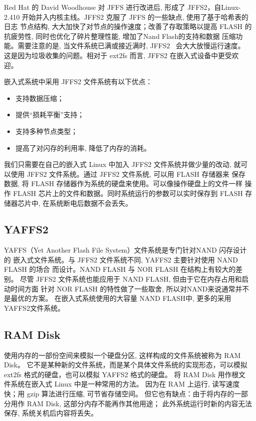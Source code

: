 Red Hat 的 David Woodhouse 对 JFFS 进行改进后, 形成了 JFFS2，自Linux-2.410
开始并入内核主线。JFFS2 克服了 JFFS 的一些缺点, 使用了基于哈希表的日志
节点结构, 大大加快了对节点的操作速度；改善了存取策略以提高 FLASH 的
抗疲劳性, 同时也优化了碎片整理性能, 增加了Nand Flash的支持和数据
压缩功能。需要注意的是, 当文件系统已满或接近满时, JFFS2~ 会大大放慢运行速度。
这是因为垃圾收集的问题。相对于 ext2fs 而言, JFFS2 在嵌入式设备中更受欢迎。

    嵌入式系统中采用 JFFS2 文件系统有以下优点：
\begin{itemize}
  \item 支持数据压缩；
  \item 提供``损耗平衡''支持；
  \item 支持多种节点类型；
  \item 提高了对闪存的利用率, 降低了内存的消耗。
\end{itemize}

我们只需要在自己的嵌入式 Linux 中加入 JFFS2 文件系统并做少量的改动, 
就可以使用 JFFS2 文件系统。通过 JFFS2 文件系统, 可以用 FLASH 存储器来
保存数据, 将 FLASH 存储器作为系统的硬盘来使用。可以像操作硬盘上的文件一样
操作 FLASH 芯片上的文件和数据。同时系统运行的参数可以实时保存到 FLASH
存储器芯片中, 在系统断电后数据不会丢失。

\subsection{YAFFS2}
YAFFS（Yet Another Flash File System）文件系统是专门针对NAND 闪存设计的
嵌入式文件系统。与 JFFS2 文件系统不同, YAFFS2 主要针对使用 NAND FLASH 的场合
而设计。NAND FLASH 与 NOR FLASH 在结构上有较大的差别。
尽管 JFFS2 文件系统也能应用于 NAND FLASH, 但由于它在内存占用和启动时间方面
针对 NOR FLASH 的特性做了一些取舍, 所以对NAND来说通常并不是最优的方案。
在嵌入式系统使用的大容量 NAND FLASH中, 更多的采用YAFFS2文件系统。

\subsection{RAM Disk}
使用内存的一部份空间来模拟一个硬盘分区, 这样构成的文件系统被称为 RAM Disk。
它不是某种新的文件系统，而是某个具体文件系统的实现形态，可以模拟 ext2fs
格式的硬盘，也可以模拟 YAFFS2 格式的硬盘。
将 RAM Disk 用作根文件系统在嵌入式 Linux 中是一种常用的方法。
因为在 RAM 上运行, 读写速度快；用 gzip 算法进行压缩, 可节省存储空间。
但它也有缺点：由于将内存的一部分用作 RAM Disk, 这部分内存不能再作其他用途；
此外系统运行时新的内容无法保存, 系统关机后内容将丢失。

